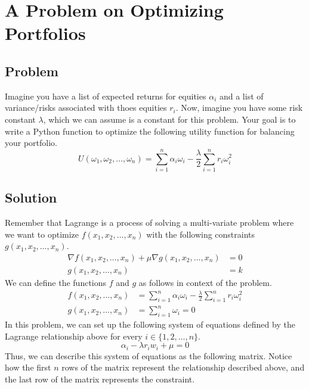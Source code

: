 \section{A Problem on Optimizing Portfolios}
\subsection{Problem}
Imagine you have a list of expected returns for equities $\alpha_i$ and a list of variance/risks associated with thoes equities $r_i$. Now, imagine you have some risk constant $\lambda$, which we can assume is a constant for this problem. Your goal is to write a Python function to optimize the following utility function for balancing your portfolio.
$$
U(\omega_1, \omega_2, \dots, \omega_n) = \sum_{i=1}^n \alpha_i\omega_i - \frac{\lambda}{2} \sum_{i=1}^n r_i\omega_i^2
$$
\subsection{Solution}
Remember that Lagrange is a process of solving a multi-variate problem where we want to optimize $f(x_1,x_2,\dots,x_n)$ with the following constraints $g(x_1, x_2, \dots, x_n)$. 
\begin{align*}
\nabla f(x_1,x_2, \dots, x_n) + \mu \nabla g(x_1,x_2,\dots,x_n) &= 0\\
g(x_1, x_2, \dots, x_n) &= k
\end{align*}
We can define the functions $f$ and $g$ as follows in context of the problem.
\begin{align*}
  f(x_1, x_2, \dots, x_n) &= \sum_{i=1}^n \alpha_i\omega_i - \frac{\lambda}{2} \sum_{i=1}^n r_i\omega_i^2 \\
  g(x_1,x_2,\dots, x_n) &= \sum_{i=1}^n \omega_i = 0
\end{align*}
In this problem, we can set up the following system of equations defined by the Lagrange relationship above for every $i \in \{1,2,\dots,n\}$. 
$$
\alpha_i - \lambda r_iw_i + \mu = 0
$$
Thus, we can describe this system of equations as the following matrix. Notice how the first $n$ rows of the matrix represent the relationship described above, and the last row of the matrix represents the constraint.
